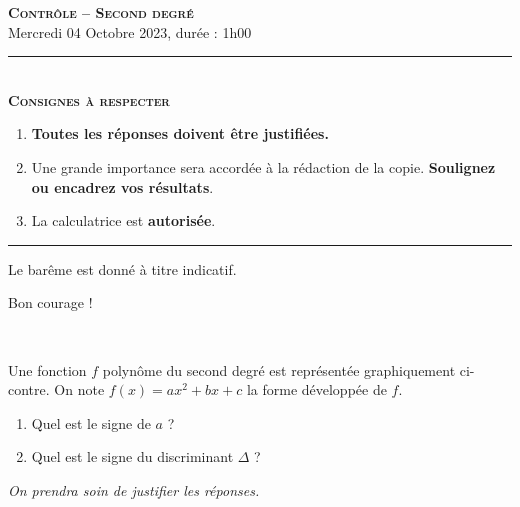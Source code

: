 \documentclass[11pt]{article}
\begin{document}
%
%
%
%
%
%

\begin{center}
\textbf{\LARGE \textsc{Contrôle -- Second degré}}\\[2mm]

{\large Mercredi 04 Octobre 2023, durée : 1h00}\\[1mm]
\noindent\rule{8cm}{0.4pt}\\[1mm]
\textbf{\textsc{Consignes à respecter}}
\begin{enumerate}[label=\textbf{\arabic*/}]
\item \textbf{Toutes les réponses doivent être justifiées.}
\item Une grande importance sera accordée à la rédaction de la
  copie. \textbf{Soulignez ou encadrez vos résultats}.
\item La calculatrice est \textbf{autorisée}.
    \end{enumerate}
\noindent\rule{12cm}{0.4pt}
\end{center}

\vspace{2mm}
\noindent Le barême est donné à titre indicatif.
\vspace{2mm}
\begin{center}
  Bon courage !
\end{center}

\begin{exo}[$2$ points]~\\[-7mm]
  \begin{minipage}{.47\textwidth}
  Une fonction $f$ polynôme du second degré est représentée graphiquement
  ci-contre. On note $f(x) = ax^2+bx+c$ la forme développée de $f$.
  \begin{enumerate}
    \item Quel est le signe de $a$ ?
    \item Quel est le signe du discriminant $\Delta$ ?
  \end{enumerate}
  \emph{On prendra soin de justifier les réponses.}
\end{minipage}
\begin{minipage}{.47\textwidth}
  \begin{center}
\end{center}
\end{minipage}
\end{exo}
\end{document}
